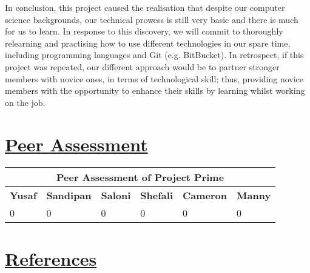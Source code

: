 \documentclass{article}
\begin{document}
In conclusion, this project caused the realisation that despite our computer science backgrounds, our technical prowess is still very basic and there is much for us to learn. In response to this discovery, we will commit to thoroughly relearning and practising how to use different technologies in our spare time, including programming languages and Git (e.g. BitBucket). In retrospect, if this project was repeated, our different approach would be to partner stronger members with novice ones, in terms of technological skill; thus, providing novice members with the opportunity to enhance their skills by learning whilst working on the job.   

\section{\underline{Peer Assessment}}
\begin{tabular}{|p{2cm}|p{2cm}|p{2cm}|p{2cm}|p{2cm}|p{2cm}|}
\hline
\multicolumn{6}{|c|}{\textbf{Peer Assessment of Project Prime}} \\
\hline
\textbf{Yusaf} & \textbf{Sandipan} & \textbf{Saloni} & \textbf{Shefali} & \textbf{Cameron} & \textbf{Manny} \\
\hline
0 & 0 & 0 & 0 & 0 & 0 \\
\hline
\end{tabular}
	
\section{\underline{References}}
\end{document}
